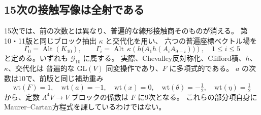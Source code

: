 \subsection{15次の接触写像は全射である}
\label{subsec:v12-contact-rank-fifteenth}

15次では、前の次数とは異なり、普遍的な線形接触商そのものが消える。
第10・11版と同じブロック抽出 $\kappa$ と交代化を用い、
六つの普遍座標ベクトル場を
\[
 \Gamma_0=\operatorname{Alt}(K_{10}),\qquad
 \Gamma_i=\operatorname{Alt}\,\kappa\!\left(
      h\bigl(A_1h(A_iA_{9-i})\bigr)\right),\quad1\le i\le5
\]
と定める。いずれも $\mathcal G_{10}$ に属する。
実際、Chevalley反対称化、Clifford積、$h$、$\kappa$、交代化は
普遍的な $\mathrm{GL}(V)$ 同変操作であり、$F$ に多項式的である。
$a$ の次数は10で、前版と同じ補助重み
\[
 \mathrm{wt}(F)=1,\quad\mathrm{wt}(a)=-1,\quad
 \mathrm{wt}(x)=0,\quad\mathrm{wt}(\theta)=-\tfrac12,
 \quad\mathrm{wt}(\eta)=\tfrac12
\]
から、定数 $\Lambda^4V\to V$ ブロックの係数は $F$ に9次となる。
これらの部分項自身にMaurer--Cartan方程式を課しているわけではない。

